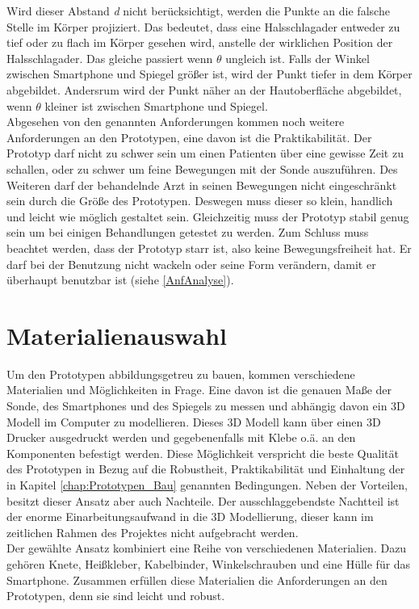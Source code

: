Wird dieser Abstand \textit{d} nicht berücksichtigt, werden die Punkte an die falsche Stelle im Körper projiziert. Das bedeutet, dass eine Halsschlagader entweder zu tief oder zu flach im Körper gesehen wird, anstelle der wirklichen Position der Halsschlagader. Das gleiche passiert wenn $\theta$ ungleich ist. Falls der Winkel zwischen Smartphone und Spiegel größer ist, wird der Punkt tiefer in dem Körper abgebildet. Andersrum wird der Punkt näher an der Hautoberfläche abgebildet, wenn $\theta$ kleiner ist zwischen Smartphone und Spiegel.\\
Abgesehen von den genannten Anforderungen kommen noch weitere Anforderungen an den Prototypen, eine davon ist die Praktikabilität. Der Prototyp darf nicht zu schwer sein um einen Patienten über eine gewisse Zeit zu schallen, oder zu schwer um feine Bewegungen mit der Sonde auszuführen. Des Weiteren darf der behandelnde Arzt in seinen Bewegungen nicht eingeschränkt sein durch die Größe des Prototypen. Deswegen muss dieser so klein, handlich und leicht wie möglich gestaltet sein. Gleichzeitig muss der Prototyp stabil genug sein um bei einigen Behandlungen getestet zu werden. Zum Schluss muss beachtet werden, dass der Prototyp starr ist, also keine Bewegungsfreiheit hat. Er darf bei der Benutzung nicht wackeln oder seine Form verändern, damit er überhaupt benutzbar ist (siehe \ref{AnfAnalyse}).

\section{Materialienauswahl}
Um den Prototypen abbildungsgetreu zu bauen, kommen verschiedene Materialien und Möglichkeiten in Frage. Eine davon ist die genauen Maße der Sonde, des Smartphones und des Spiegels zu messen und abhängig davon ein 3D Modell im Computer zu modellieren. Dieses 3D Modell kann über einen 3D Drucker ausgedruckt werden und gegebenenfalls mit Klebe o.ä. an den Komponenten befestigt werden. Diese Möglichkeit verspricht die beste Qualität des Prototypen in Bezug auf die Robustheit, Praktikabilität und Einhaltung der in Kapitel \ref{chap:Prototypen_Bau} genannten Bedingungen. Neben der Vorteilen, besitzt dieser Ansatz aber auch Nachteile. Der ausschlaggebendste Nachtteil ist der enorme Einarbeitungsaufwand in die 3D Modellierung, dieser kann im zeitlichen Rahmen des Projektes nicht aufgebracht werden.\\
Der gewählte Ansatz kombiniert eine Reihe von verschiedenen Materialien. Dazu gehören Knete, Heißkleber, Kabelbinder, Winkelschrauben und eine Hülle für das Smartphone. Zusammen erfüllen diese Materialien die Anforderungen an den Prototypen, denn sie sind leicht und robust.

